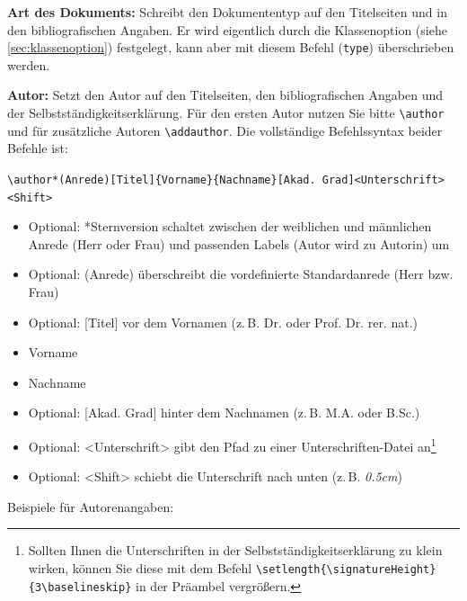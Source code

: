 \textbf{Art des Dokuments:}\label{cmd:type}
Schreibt den Dokumententyp auf den Titelseiten und in den bibliografischen Angaben. Er wird eigentlich durch die Klassenoption (siehe \cref{sec:klassenoption}) festgelegt, kann aber mit diesem Befehl (\texttt{type}) überschrieben werden.

\textbf{Autor:}\label{cmd:author}
Setzt den Autor auf den Titelseiten, den bibliografischen Angaben und der Selbstständigkeitserklärung. Für den ersten Autor nutzen Sie bitte \verb|\author| und für zusätzliche Autoren \verb|\addauthor|. Die vollständige Befehlssyntax beider Befehle ist:


{\small\verb|\author*(Anrede)[Titel]{Vorname}{Nachname}[Akad. Grad]<Unterschrift><Shift>|}
	\begin{itemize}
		\item Optional: *Sternversion schaltet zwischen der weiblichen und männlichen Anrede (Herr oder Frau) und passenden Labels (Autor wird zu Autorin) um
		\item Optional: (Anrede) überschreibt die vordefinierte Standardanrede (Herr bzw. Frau)
		\item Optional: [Titel] vor dem Vornamen (z.\,B. Dr. oder Prof. Dr. rer. nat.)
		\item Vorname
		\item Nachname
		\item Optional: [Akad. Grad] hinter dem Nachnamen (z.\,B. M.A. oder B.Sc.)
		\item Optional: <Unterschrift> gibt den Pfad zu einer Unterschriften-Datei an\footnote{Sollten Ihnen die Unterschriften in der Selbstständigkeitserklärung zu klein wirken, können Sie diese mit dem Befehl \texttt{\textbackslash{}setlength\{\textbackslash{}signatureHeight\}\{3\textbackslash{}baselineskip\}} in der Präambel vergrößern.}
		\item Optional: <Shift> schiebt die Unterschrift nach unten (z.\,B. \textit{0.5cm})
	\end{itemize}\vspace*{-\baselineskip}
	Beispiele für Autorenangaben:
